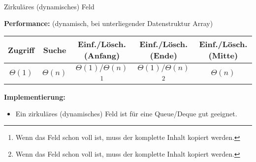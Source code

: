 \documentclass[german]{../spicker}
\begin{document}
\begin{defi}{Zirkuläres (dynamisches) Feld}
\begin{center}
    \end{center}

    \textbf{Performance:} (dynamisch, bei unterliegender Datenstruktur Array)

    \begin{center}
        \begin{tabular}{c|c|c|c|c}
            Zugriff     & Suche       & Einf./Lösch. (Anfang)                                                                                   & Einf./Lösch. (Ende)                                                                                     & Einf./Lösch. (Mitte) \\
            \hline
            $\Theta(1)$ & $\Theta(n)$ & $\Theta(1)/\Theta(n)$\footnote{Wenn das Feld schon voll ist, muss der komplette Inhalt kopiert werden.} & $\Theta(1)/\Theta(n)$\footnote{Wenn das Feld schon voll ist, muss der komplette Inhalt kopiert werden.} & $\Theta(n)$          \\
        \end{tabular}
    \end{center}

    \textbf{Implementierung:}
    \begin{itemize}
        \item Ein zirkuläres (dynamisches) Feld ist für eine Queue/Deque gut geeignet.
    \end{itemize}
\end{defi}
\end{document}
